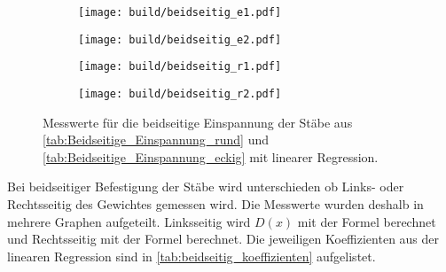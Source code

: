 \begin{figure}[h!]
    \centering
    \begin{subfigure}{0.49\textwidth}
        \centering
        \texttt{[image: build/beidseitig\_e1.pdf]}
        \label{fig:eckig_beidseitig1}
    \end{subfigure}
    \begin{subfigure}{0.49\textwidth}
        \centering
        \texttt{[image: build/beidseitig\_e2.pdf]}
        \label{fig:eckig_beidseitig2}
    \end{subfigure}
    \centering
    \begin{subfigure}{0.49\textwidth}
        \centering
        \texttt{[image: build/beidseitig\_r1.pdf]}
        \label{fig:rund_beidseitig1}
    \end{subfigure}
    \begin{subfigure}{0.49\textwidth}
        \centering
        \texttt{[image: build/beidseitig\_r2.pdf]}
        \label{fig:rund_beidseitig2}
    \end{subfigure}
    \caption{Messwerte für die beidseitige Einspannung der Stäbe aus \autoref{tab:Beidseitige_Einspannung_rund} und \autoref{tab:Beidseitige_Einspannung_eckig} mit linearer Regression.}
    \label{fig:beidseitig}
\end{figure}
\newpage
Bei beidseitiger Befestigung der Stäbe wird unterschieden ob Links- oder Rechtsseitig des Gewichtes gemessen wird.
Die Messwerte wurden deshalb in mehrere Graphen aufgeteilt. Linksseitig wird $D(x)$ mit der Formel %
berechnet und Rechtsseitig mit der Formel %
berechnet. Die jeweiligen Koeffizienten aus der linearen Regression sind in \autoref{tab:beidseitig_koeffizienten} aufgelistet.
